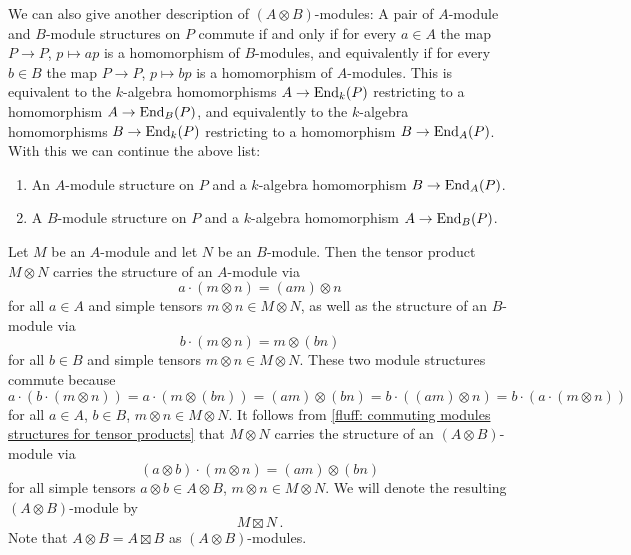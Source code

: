 \begin{fluff}
  We can also give another description of $(A \otimes B)$-modules:
  A pair of $A$-module and $B$-module structures on $P$ commute if and only if for every $a \in A$ the map $P \to P$, $p \mapsto ap$ is a homomorphism of $B$-modules, and equivalently if for every $b \in B$ the map $P \to P$, $p \mapsto bp$ is a homomorphism of $A$-modules.
  This is equivalent to the $k$-algebra homomorphisms $A \to \operatorname{End}_k(P)$ restricting to a homomorphism $A \to \operatorname{End}_B(P)$, and equivalently to the $k$-algebra homomorphisms $B \to \operatorname{End}_k(P)$ restricting to a homomorphism $B \to \operatorname{End}_A(P)$.
  With this we can continue the above list:
  \begin{enumerate}[resume]
    \item
      An $A$-module structure on $P$ and a $k$-algebra homomorphism $B \to \operatorname{End}_A(P)$.
    \item
      A $B$-module structure on $P$ and a $k$-algebra homomorphism $A \to \operatorname{End}_B(P)$.
  \end{enumerate}
\end{fluff}


\begin{fluff}
  Let $M$ be an $A$-module and let $N$ be an $B$-module.
  Then the tensor product $M \otimes N$ carries the structure of an $A$-module via
  \[
      a \cdot (m \otimes n)
    = (am) \otimes n
  \]
  for all $a \in A$ and simple tensors $m \otimes n \in M \otimes N$, as well as the structure of an $B$-module via
  \[
      b \cdot (m \otimes n)
    = m \otimes (bn)
  \]
  for all $b \in B$ and simple tensors $m \otimes n \in M \otimes N$.
  These two module structures commute because
  \[
      a \cdot (b \cdot (m \otimes n))
    = a \cdot (m \otimes (bn))
    = (am) \otimes (bn)
    = b \cdot ((am) \otimes n)
    = b \cdot (a \cdot (m \otimes n))
  \]
  for all $a \in A$, $b \in B$, $m \otimes n \in M \otimes N$.
  It follows from \ref{fluff: commuting modules structures for tensor products} that $M \otimes N$ carries the structure of an $(A \otimes B)$-module via
  \[
      (a \otimes b) \cdot (m \otimes n)
    = (am) \otimes (bn)
  \]
  for all simple tensors $a \otimes b \in A \otimes B$, $m \otimes n \in M \otimes N$.
  We will denote the resulting $(A \otimes B)$-module by
  \[
    M \mathbin{\boxtimes} N \,.
  \]
  Note that $A \otimes B = A \mathbin{\boxtimes} B$ as $(A \otimes B)$-modules.
\end{fluff}


